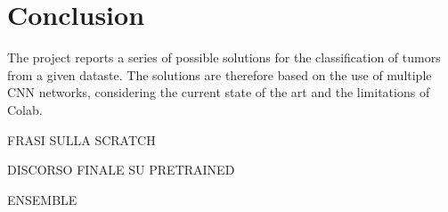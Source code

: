 \section{Conclusion}
The project reports a series of possible solutions for the classification of tumors from a given dataste. The solutions are therefore based on the use of multiple CNN networks, considering the current state of the art and the limitations of Colab.

FRASI SULLA SCRATCH

DISCORSO FINALE SU PRETRAINED

ENSEMBLE